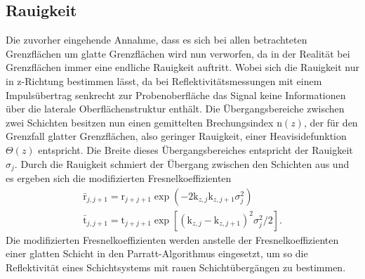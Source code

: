 \subsection{Rauigkeit}
\label{subsec:rauigkeit}
Die zuvorher eingehende
Annahme, dass es sich bei allen betrachteten
Grenzflächen um
glatte Grenzflächen wird nun verworfen, da in
der Realität bei Grenzflächen immer
eine endliche Rauigkeit auftritt.
Wobei sich die Rauigkeit nur in z-Richtung bestimmen lässt,
da bei Reflektivitätsmessungen mit einem
Impulsübertrag senkrecht zur Probenoberfläche
das Signal
keine Informationen über die laterale Oberflächenstruktur
enthält. Die Übergangsbereiche zwischen
zwei Schichten besitzen
nun einen gemittelten Brechungsindex
$\mathrm{n}(z)$, der für den Grenzfall
glatter Grenzflächen, also geringer Rauigkeit,
einer Heavisidefunktion $\Theta(z)$ entspricht.
Die Breite dieses Übergangsbereiches
entspricht der Rauigkeit $\sigma_j$.
Durch die Rauigkeit schmiert der Übergang
zwischen den Schichten aus und es ergeben sich die
modifizierten Fresnelkoeffizienten
\begin{align}
\bar{\mathrm{r}}_{j,j+1} = \mathrm{r}_{j+j+1} \exp\left(-2\mathrm{k}_{z,j}\mathrm{k}_{z,j+1}\sigma^2_j\right)  \\
\bar{\mathrm{t}}_{j,j+1} = \mathrm{t}_{j+j+1} \exp\left[\left(\mathrm{k}_{z,j}-\mathrm{k}_{z,j+1}\right)^2\sigma^2_j/2\right].
\end{align}
Die modifizierten Fresnelkoeffizienten werden
anstelle der Fresnelkoeffizienten einer glatten
Schicht in den Parratt-Algorithmus eingesetzt,
um so die Reflektivität eines
Schichtsystems mit rauen Schichtübergängen
zu bestimmen.











\cite{sample}
